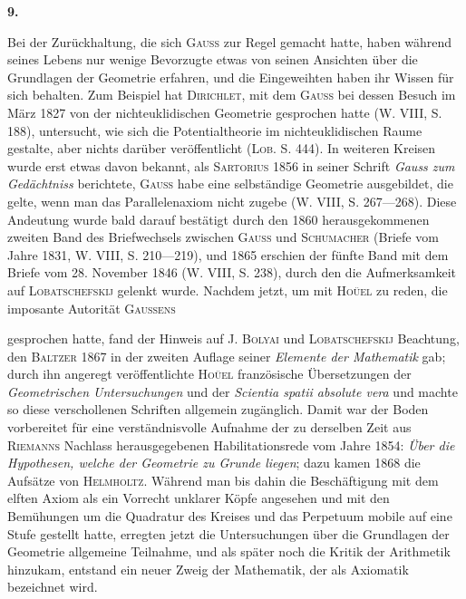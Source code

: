 \clearpage\begingroup{}
\begin{center}
\textbf{9.}\par\smallskip
{}
\end{center}
\noindent\hspace*{\parindent}Bei der Zurückhaltung, die sich \textsc{Gauss} zur Regel gemacht hatte, haben
während seines Lebens nur wenige Bevorzugte etwas von seinen Ansichten
über die Grundlagen der Geometrie erfahren, und die Eingeweihten haben
ihr Wissen für sich behalten. Zum Beispiel hat \textsc{Dirichlet}, mit dem \textsc{Gauss}
bei dessen Besuch im März 1827 von der nichteuklidischen Geometrie gesprochen
hatte (W. VIII, S. 188), untersucht, wie sich die Potentialtheorie im
nichteuklidischen Raume gestalte, aber nichts darüber veröffentlicht (\textsc{Lob.} S. 444).
In weiteren Kreisen wurde erst etwas davon bekannt, als \textsc{Sartorius} 1856 in
seiner Schrift \textit{Gauss zum Gedächtniss} berichtete, \textsc{Gauss} habe eine selbständige
Geometrie ausgebildet, die gelte, wenn man das Parallelenaxiom nicht zugebe
(W. VIII, S. 267—268). Diese Andeutung wurde bald darauf bestätigt durch
den 1860 herausgekommenen zweiten Band des Briefwechsels zwischen \textsc{Gauss}
und \textsc{Schumacher} (Briefe vom Jahre 1831, W. VIII, S. 210—219), und 1865
erschien der fünfte Band mit dem Briefe vom 28. November 1846 (W. VIII,
S. 238), durch den die Aufmerksamkeit auf \textsc{Lobatschefskij} gelenkt wurde.
Nachdem jetzt, um mit \textsc{Hoüel} zu reden, die imposante Autorität \textsc{Gaussens}
\par\vfill{}
\clearpage{}
\noindent gesprochen hatte, fand der Hinweis auf J. \textsc{Bolyai} und \textsc{Lobatschefskij} Beachtung,
den \textsc{Baltzer} 1867 in der zweiten Auflage seiner \textit{Elemente der
Mathematik} gab; durch ihn angeregt veröffentlichte \textsc{Hoüel} französische Übersetzungen
der \textit{Geometrischen Untersuchungen} und der \textit{Scientia spatii absolute vera}
und machte so diese verschollenen Schriften allgemein zugänglich. Damit
war der Boden vorbereitet für eine verständnisvolle Aufnahme der zu derselben
Zeit aus \textsc{Riemanns} Nachlass herausgegebenen Habilitationsrede vom
Jahre 1854: \textit{Über die Hypothesen, welche der Geometrie zu Grunde liegen};
dazu kamen 1868 die Aufsätze von \textsc{Helmholtz}. Während man bis dahin die
Beschäftigung mit dem elften Axiom als ein Vorrecht unklarer Köpfe angesehen
und mit den Bemühungen um die Quadratur des Kreises und das Perpetuum
mobile auf eine Stufe gestellt hatte, erregten jetzt die Untersuchungen
über die Grundlagen der Geometrie allgemeine Teilnahme, und als später
noch die Kritik der Arithmetik hinzukam, entstand ein neuer Zweig der
Mathematik, der als Axiomatik bezeichnet wird.
\clearpage\endgroup
